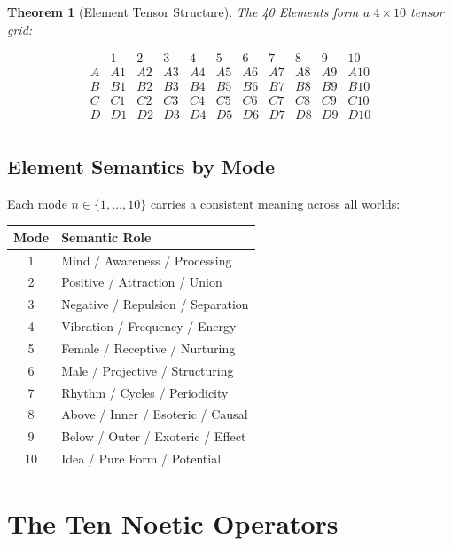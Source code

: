 \documentclass[11pt,twoside,openright]{book}
\theoremstyle{definition}
\theoremstyle{plain}
\newtheorem{theorem}[definition]{Theorem}
\theoremstyle{remark}
\begin{document}
\begin{theorem}[Element Tensor Structure]
\label{thm:element-tensor}
The 40 Elements form a $4 \times 10$ tensor grid:

\[
\begin{array}{c|cccccccccc}
 & 1 & 2 & 3 & 4 & 5 & 6 & 7 & 8 & 9 & 10 \\
\hline
A & A1 & A2 & A3 & A4 & A5 & A6 & A7 & A8 & A9 & A10 \\
B & B1 & B2 & B3 & B4 & B5 & B6 & B7 & B8 & B9 & B10 \\
C & C1 & C2 & C3 & C4 & C5 & C6 & C7 & C8 & C9 & C10 \\
D & D1 & D2 & D3 & D4 & D5 & D6 & D7 & D8 & D9 & D10 \\
\end{array}
\]
\end{theorem}

\subsection{Element Semantics by Mode}

Each mode $n \in \{1, \ldots, 10\}$ carries a consistent meaning across all worlds:

\begin{center}
\begin{tabular}{cl}
\toprule
\textbf{Mode} & \textbf{Semantic Role} \\
\midrule
1 & Mind / Awareness / Processing \\
2 & Positive / Attraction / Union \\
3 & Negative / Repulsion / Separation \\
4 & Vibration / Frequency / Energy \\
5 & Female / Receptive / Nurturing \\
6 & Male / Projective / Structuring \\
7 & Rhythm / Cycles / Periodicity \\
8 & Above / Inner / Esoteric / Causal \\
9 & Below / Outer / Exoteric / Effect \\
10 & Idea / Pure Form / Potential \\
\bottomrule
\end{tabular}
\end{center}

\section{The Ten Noetic Operators}
\end{document}
